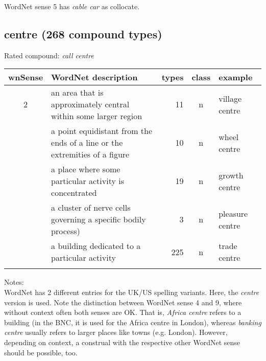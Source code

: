 \noindent
WordNet sense 5 has \emph{cable car} as collocate.
\subsection{centre    (268 compound types)}
Rated compound: \emph{call centre}

\vspace*{1ex}

\noindent
\begin{longtable}{c>{\raggedright\arraybackslash}p{5cm}rc>{\raggedright\arraybackslash}p{2cm}}\lsptoprule
{\small wnSense}&WordNet description&types&class&example\\\midrule
2&an area that is approximately central within some larger region&11&n&village centre\\\tablevspace
3&a point equidistant from the ends of a line or the extremities of a figure&10&n&wheel centre\\\tablevspace
4&a place where some particular activity is concentrated&19&n&growth centre\\\tablevspace
8&a cluster of nerve cells governing a specific bodily process)&3&n&pleasure centre\\\tablevspace
9&a building dedicated to a particular activity&225&n&trade centre\\\lspbottomrule
\end{longtable}

\noindent
Notes:\\
WordNet has 2 different entries for the UK/US spelling variants. Here, the \emph{centre} version is used. Note the distinction between WordNet sense 4 and 9, where without context often both senses are OK. That is, \emph{Africa centre} refers to a building (in the BNC, it is used for the Africa centre in London), whereas \emph{banking centre} usually refers to larger places like towns (e.g. London). However, depending on context, a construal with the respective other WordNet sense should be possible, too.

